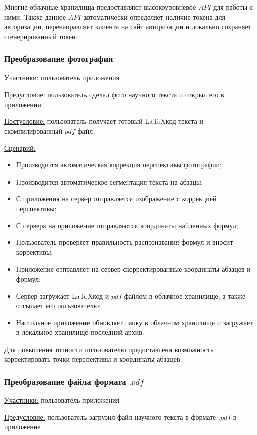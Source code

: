 Многие облачные хранилища предоставляют высокоуровневое $API$ для работы с ними. Также данное $API$ автоматически определяет наличие токена для авторизации, перенаправляет клиента на сайт авторизации и локально сохраняет сгенерированный токен.

\subsubsection{Преобразование фотографии}
\underline{Участники:} пользователь приложения

\underline{Предусловие:} пользователь сделал фото научного текста и открыл его в приложении

\underline{Постусловие:} пользователь получает готовый \LaTeX\-код текста и скомпилированный $pdf$ файл

\underline{Сценарий:}
\begin{itemize}
    \item Производится автоматическая коррекция перспективы фотографии;
    \item Производится автоматическое сегментация текста на абзацы;
    \item С приложения на сервер отправляется изображение с коррекцией перспективы;
    \item С сервера на приложение отправляются координаты найденных формул;
    \item Пользователь проверяет правильность распознавания формул и вносит коррективы;
    \item Приложение отправляет на сервер скорректированные координаты абзацев и формул;
    \item Сервер загружает \LaTeX\-код и $pdf$ файлом в облачное хранилище, а также отсылает его пользователю;
    \item Настольное приложение обновляет папку в облачном хранилище и загружает в локальное хранилище последний архив.
\end{itemize}

Для повышения точности пользователю предоставлена возможность корректировать точки перспективы и координаты абзацев.
\subsubsection{Преобразование файла формата $.pdf$}
\underline{Участники:} пользователь приложения

\underline{Предусловие:} пользователь загрузил файл научного текста в формате $.pdf$ в приложение

